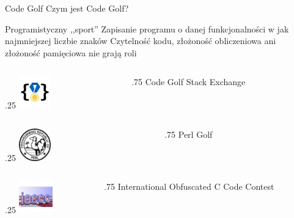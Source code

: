 \begin{frame}{Code Golf}
    Czym jest Code Golf?
    \begin{itemize}
        \myitem Programistyczny ,,sport''
        \myitem Zapisanie programu o danej funkcjonalności w jak najmniejszej liczbie znaków
        \myitem Czytelność kodu, złożoność obliczeniowa ani złożoność pamięciowa nie grają roli
    \end{itemize}

    \vspace*{0.3cm}

    \begin{columns}
        \begin{column}{.25\hsize}
            {\hspace*{0.7cm}\includegraphics[height=1.4cm]{figures/codegolf_logo.png}}
        \end{column}
        \begin{column}{.75\hsize}
            Code Golf Stack Exchange
        \end{column}
    \end{columns}

    \begin{columns}
        \begin{column}{.25\hsize}
            {\hspace*{0.7cm}\includegraphics[height=1.4cm]{figures/perl_logo.png}}
        \end{column}
        \begin{column}{.75\hsize}
            Perl Golf
        \end{column}
    \end{columns}

    \begin{columns}
        \begin{column}{.25\hsize}
            {\hspace*{0.7cm}\includegraphics[height=1.4cm]{figures/ioccc_logo.jpeg}}
        \end{column}
        \begin{column}{.75\hsize}
            International Obfuscated C Code Contest
        \end{column}
    \end{columns}

\end{frame}
